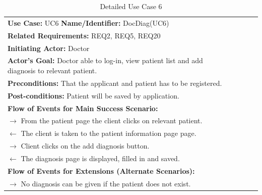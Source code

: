 \documentclass[a4paper]{article}
\begin{document}
\FloatBarrier

\begin{table}[h!]
\centering
\caption*{Detailed Use Case 6}
\label{DetailedUC2}
\begin{tabular}{|c|llll}
\cline{1-1}

\multicolumn{1}{|l|}{\textbf{Use Case:} UC6 \textbf{Name/Identifier:} DocDiag(UC6)} &  &  &  &  \\ \cline{1-1}

\multicolumn{1}{|l|}{\textbf{Related Requirements:} REQ2, REQ5, REQ20} &  &  &  &  \\

\multicolumn{1}{|l|}{\textbf{Initiating Actor:} Doctor} &  &  &  &  \\

\multicolumn{1}{|l|}{\textbf{Actor’s Goal:} Doctor able to log-in, view patient list and add diagnosis to relevant patient.} &  &  &  &  \\

\multicolumn{1}{|l|}{\textbf{Preconditions:} That the applicant and patient has to be registered.} &  &  &  &  \\

\multicolumn{1}{|l|}{\textbf{Post-conditions:} Patient will be saved by application.} &  &  &  &  \\

\multicolumn{1}{|l|}{\textbf{Flow of Events for Main Success Scenario:}} &  &  &  &  \\

\multicolumn{1}{|l|}{ $ \rightarrow $ From the patient page the client clicks on relevant patient.} &  &  &  &  \\

\multicolumn{1}{|l|}{ $ \leftarrow $ The client is taken to the patient information page page.} &  &  &  &  \\

\multicolumn{1}{|l|}{ $ \rightarrow $ Client clicks on the add diagnosis button.} &  &  &  &  \\

\multicolumn{1}{|l|}{ $ \leftarrow $ The diagnosis page is displayed, filled in and saved.} &  &  &  &  \\

\multicolumn{1}{|l|}{\textbf{Flow of Events for Extensions (Alternate Scenarios):}} &  &  &  &  \\

\multicolumn{1}{|l|}{ $ \rightarrow $ No diagnosis can be given if the patient does not exist.} &  &  &  &  \\ \cline{1-1}

\end{tabular}
\end{table}
\end{document}
